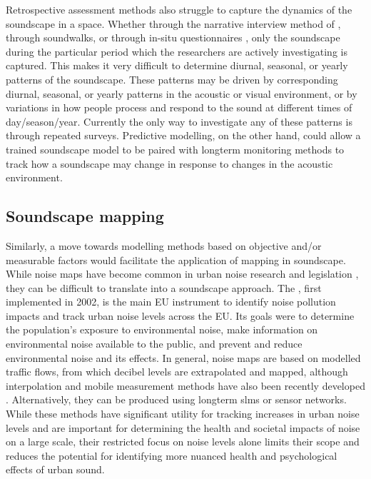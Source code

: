 Retrospective assessment methods also struggle to capture the dynamics of the soundscape in a space. Whether through the narrative interview method of \citet[Sec. 5.4]{ISO12913Part2}, through soundwalks, or through in-situ questionnaires \citep{Mitchell2020Soundscape}, only the soundscape during the particular period which the researchers are actively investigating is captured. This makes it very difficult to determine diurnal, seasonal, or yearly patterns of the soundscape. These patterns may be driven by corresponding diurnal, seasonal, or yearly patterns in the acoustic or visual environment, or by variations in how people process and respond to the sound at different times of day/season/year. Currently the only way to investigate any of these patterns is through repeated surveys. Predictive modelling, on the other hand, could allow a trained soundscape model to be paired with longterm monitoring methods to track how a soundscape may change in response to changes in the acoustic environment.

\subsection{Soundscape mapping}
Similarly, a move towards modelling methods based on objective and/or measurable factors would facilitate the application of mapping in soundscape. While noise maps have become common in urban noise research and legislation \citep{EEA2020Environmental,Gasco2020Social}, they can be difficult to translate into a soundscape approach. The  \citep{Directive200249ECEuropeanUniEuropean}, first implemented in 2002, is the main EU instrument to identify noise pollution impacts and track urban noise levels across the EU. Its goals were to determine the population's exposure to environmental noise, make information on environmental noise available to the public, and prevent and reduce environmental noise and its effects. In general, noise maps are based on modelled traffic flows, from which decibel levels are extrapolated and mapped, although interpolation and mobile measurement methods have also been recently developed \citep{Aumond2018Kriging}. Alternatively, they can be produced using longterm \glspl{slm} or sensor networks. While these methods have significant utility for tracking increases in urban noise levels and are important for determining the health and societal impacts of noise on a large scale, their restricted focus on noise levels alone limits their scope and reduces the potential for identifying more nuanced health and psychological effects of urban sound. 

